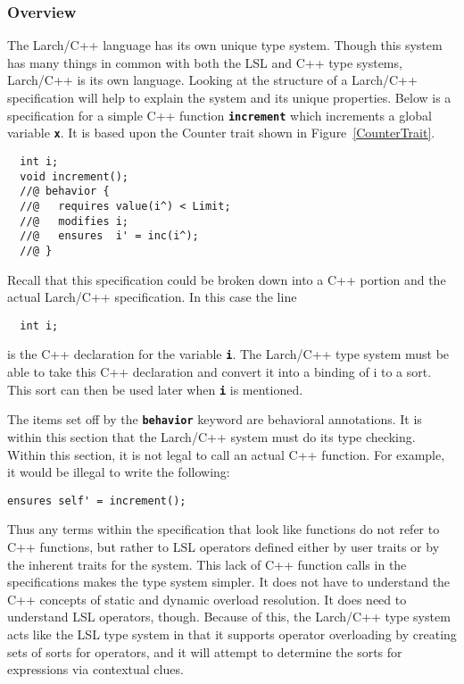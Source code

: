 \documentclass[12pt]{article} %
\newcommand{\reserved}[1]{\textbf{\texttt{#1}}} %
\begin{document}
\subsubsection{Overview}
The Larch/C++ language has its own unique type system. Though this
system has many things in common with both the LSL and C++ type
systems, Larch/C++ is its own language. Looking at the structure of a
Larch/C++ specification will help to explain the system and its
unique properties. Below is a specification for a simple C++ function
\reserved{increment} which increments a global variable
\reserved{x}. It is based upon the Counter trait shown in Figure~\ref{CounterTrait}.

\begin{verbatim}
  int i;
  void increment();
  //@ behavior {
  //@   requires value(i^) < Limit;
  //@   modifies i;
  //@   ensures  i' = inc(i^);
  //@ }
\end{verbatim}

\noindent Recall that this specification could be broken down into a
C++ portion and the actual Larch/C++ specification. In this case the line
\begin{verbatim}
  int i;
\end{verbatim}
is the C++ declaration for the variable \reserved{i}. The
Larch/C++ type system must be able to take this C++ declaration and
convert it into a binding of i to a sort. This sort can then be used later
when \reserved{i} is mentioned. 

The items set off by the \reserved{behavior} keyword are behavioral annotations. It is within this section that the
Larch/C++ system must do its type checking. Within this section, it is
not legal to call an actual C++ function. For example, it would be
illegal to write the following:
\begin{verbatim}
ensures self' = increment();
\end{verbatim}
Thus any terms within the specification that look like functions do not
refer to C++ functions, but rather to LSL operators defined either by
user traits or by the inherent traits for the system. This lack of C++
function calls in the specifications makes the type system simpler. It
does not have to understand the C++ concepts of static and dynamic
overload resolution. It does need to understand LSL operators,
though. Because of this, the Larch/C++ type system acts like the LSL
type system in that it supports operator overloading by creating sets
of sorts for operators, and it will attempt to determine the sorts for
expressions via contextual clues.
\end{document}
